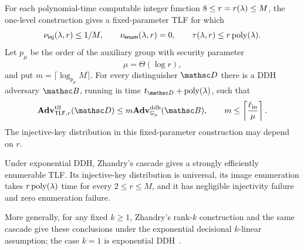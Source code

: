 \begin{proposition} \label{prop-tlf-ddh}
For each polynomial-time computable integer function
$8\le r=r(\lambda)\le M$, the one-level construction gives a fixed-parameter
TLF for which
$$
\nu_{\mathsf{inj}}(\lambda,r)\le 1/M,\qquad
\nu_{\mathsf{enum}}(\lambda,r)=0,\qquad
\tau(\lambda,r)\le r\mathop{\rm poly}\nolimits(\lambda).
$$
Let $p_\mu$ be the order of the auxiliary group with security parameter
$$
\mu=\Theta(\log r),
$$
and put $m=\lceil\log_{p_\mu}M\rceil$. For every distinguisher $\advD$ there
is a DDH adversary $\advB$, running in time
$t_{\advD}+\poly(\secp)$, such that
$$
\AdvTLF{\TLF,r}{\advD}
\le m\AdvDDH{\GG_\mu}{\advB},
\qquad
m\le\left\lceil\frac{\ellin}{\mu}\right\rceil.
$$
The injective-key distribution in this fixed-parameter construction may
depend on $r$.

Under exponential DDH, Zhandry's cascade gives a strongly efficiently
enumerable TLF. Its injective-key distribution is universal, its image
enumeration takes $r\mathop{\rm poly}\nolimits(\lambda)$ time for every $2\le r\le M$, and it has
negligible injectivity failure and zero enumeration failure.

More generally, for any fixed $k\ge1$, Zhandry's rank-$k$ construction and
the same cascade give these conclusions under the exponential decisional
$k$-linear assumption; the case $k=1$ is exponential
DDH~\cite[Theorem~3.14 and Corollary~3.15]{EPRINT:Zhandry16}.
\end{proposition}

